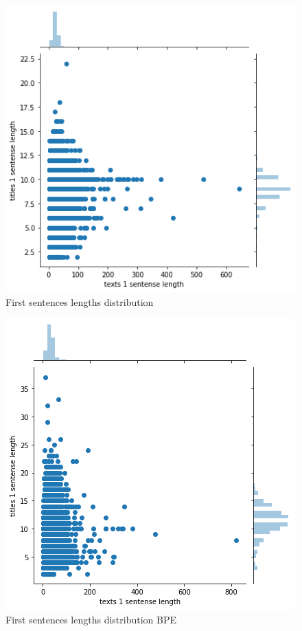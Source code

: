 \documentclass{article}
\begin{document}
\begin{figure}[H]
    \centering
    \includegraphics[width=1.0\linewidth]{sents_lens.png}
    \caption{First sentences lengths distribution}
    \label{fig:circle}
\end{figure}

\begin{figure}[H]
    \centering
    \includegraphics[width=1.0\linewidth]{lens_bpe.png}
    \caption{First sentences lengths distribution BPE}
    \label{fig:circle}
\end{figure}
\end{document}
